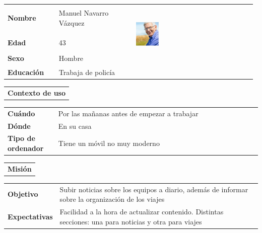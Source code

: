 \documentclass[11pt]{article}
\begin{document}
\begin{table}[H]
  \centering
  \begin{tabular}{p{0.2\linewidth}|p{0.3\linewidth}p{0.475\linewidth}}
    \toprule
    \textbf{Nombre} & Manuel Navarro Vázquez &\multirow{4}{*}{\begin{minipage}{1.\textwidth}\includegraphics[width=0.2\textwidth, height=30mm]{Pedro}\end{minipage}}\\\\
    \textbf{Edad} & 43 & \\
    \textbf{Sexo} & Hombre & \\
    \textbf{Educación} & Trabaja de policía & \\
    \bottomrule
  \end{tabular}

  \begin{tabular}{l}
    \textbf{Contexto de uso} 
  \end{tabular}
  
  \begin{tabular}{p{0.2\linewidth}|p{0.8\linewidth}}
    \toprule
    \textbf{Cuándo} & Por las mañanas antes de empezar a trabajar\\
    \textbf{Dónde}  & En su casa\\
    \textbf{Tipo de ordenador} & Tiene un móvil no muy moderno\\
    \bottomrule
  \end{tabular}

  \begin{tabular}{l}
    \textbf{Misión} 
  \end{tabular}
  
  \begin{tabular}{p{0.2\linewidth}|p{0.8\linewidth}}
    \toprule
    \textbf{Objetivo} & Subir noticias sobre los equipos a diario, además de informar sobre la organización de los viajes\\
    \textbf{Expectativas}  & Facilidad a la hora de actualizar contenido. Distintas secciones: una para noticias y otra para viajes \\
    \bottomrule
  \end{tabular}


\end{table}
\end{document}
